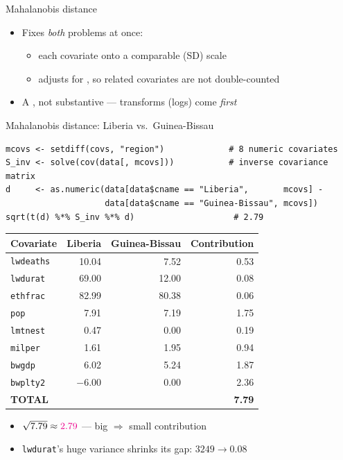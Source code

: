 \documentclass[table, xcolor = {dvipsnames}, 9pt]{beamer}
\theoremstyle{plain}
\newcommand{\mh}[1]{{\color{magenta}{#1}}}
\begin{document}
\begin{frame}[t]{Mahalanobis distance \citep{mahalanobis1936}}
\vfill
\begin{itemize} \vfill
\item Fixes \emph{both} problems at once: \vfill
\begin{itemize} \vfill
\item \mh{standardizes} each covariate onto a comparable (SD) scale \vfill
\item adjusts for \mh{correlations}, so related covariates are not double-counted \vfill
\end{itemize} \vfill
\item A \mh{statistical device}, not substantive --- transforms (logs) come \emph{first} \vfill
\end{itemize} \vfill
\end{frame}
\begin{frame}[fragile]{Mahalanobis distance: Liberia vs.\ Guinea-Bissau}
\begin{lstlisting}[style=Rstyle, basicstyle=\ttfamily\tiny, frame=single]
mcovs <- setdiff(covs, "region")             # 8 numeric covariates
S_inv <- solve(cov(data[, mcovs]))           # inverse covariance matrix
d     <- as.numeric(data[data$cname == "Liberia",       mcovs] -
                    data[data$cname == "Guinea-Bissau", mcovs])
sqrt(t(d) %*% S_inv %*% d)                    # 2.79
\end{lstlisting}
\vspace{-0.3em}
\scriptsize
\begin{table}[H]
\centering
\begin{tabular}{lrrr}
\toprule
Covariate & Liberia & Guinea-Bissau & Contribution \\
\midrule
\texttt{lwdeaths} & 10.04 & 7.52 & 0.53 \\
\texttt{lwdurat} & 69.00 & 12.00 & 0.08 \\
\texttt{ethfrac} & 82.99 & 80.38 & 0.06 \\
\texttt{pop} & 7.91 & 7.19 & 1.75 \\
\texttt{lmtnest} & 0.47 & 0.00 & 0.19 \\
\texttt{milper} & 1.61 & 1.95 & 0.94 \\
\texttt{bwgdp} & 6.02 & 5.24 & 1.87 \\
\texttt{bwplty2} & $-6.00$ & 0.00 & 2.36 \\
\midrule
\textbf{TOTAL} & & & \textbf{7.79} \\
\bottomrule
\end{tabular}
\end{table}
\normalsize
\vspace{-0.2em}
\begin{itemize}
\item $\sqrt{7.79} \approx \mh{2.79}$ --- big \mh{variance} $\Rightarrow$ small contribution \vfill
\item \texttt{lwdurat}'s huge variance shrinks its gap: $3249 \to 0.08$ \vfill
\end{itemize}
\end{frame}
\end{document}
